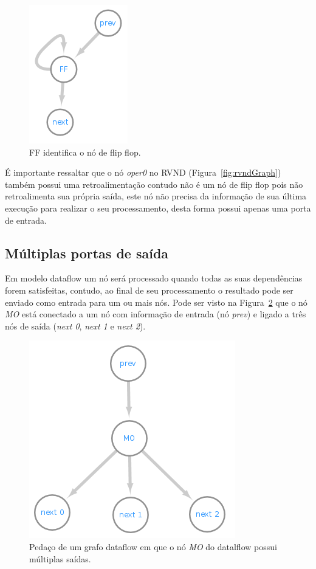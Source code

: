 \begin{figure}[htbp]
    \centerline{\includegraphics[scale=1.0]{figuras/dataflow/Flip_flop.png}}
    \caption{FF identifica o nó de flip flop.}
    \label{fig:flipFlop}
\end{figure}

É importante ressaltar que o nó \textit{oper0} no RVND (Figura~\ref{fig:rvndGraph}) também possui uma retroalimentação contudo não é um nó de flip flop pois não retroalimenta sua própria saída, este nó não precisa da informação de sua última execução para realizar o seu processamento, desta forma possui apenas uma porta de entrada.

\subsection{Múltiplas portas de saída}\label{subsec:multiplasSaidas}

Em modelo dataflow um nó será processado quando todas as suas dependências forem satisfeitas, contudo, ao final de seu processamento o resultado pode ser enviado como entrada para um ou mais nós.
Pode ser visto na Figura~\ref{fig:dataflowMo0} que o nó \textit{MO} está conectado a um nó com informação de entrada (nó \textit{prev}) e ligado a três nós de saída (\textit{next 0}, \textit{next 1} e \textit{next 2}).

\begin{figure}[htbp]
    \centerline{\includegraphics[scale=0.6]{figuras/dataflow/multi_output0.png}}
    \caption{Pedaço de um grafo dataflow em que o nó \textit{MO} do datalflow possui múltiplas saídas.}
    \label{fig:dataflowMo0}
\end{figure}

